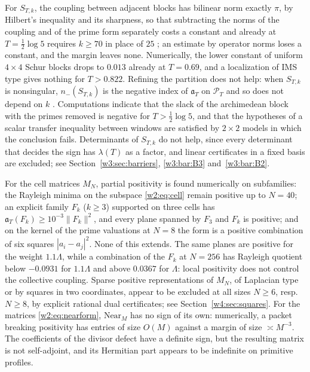 \documentclass[11pt]{amsart}
\theoremstyle{definition}
\theoremstyle{remark}
\numberwithin{equation}{section}
\newcommand{\PT}{\mathcal{P}_T}                        %
\newcommand{\aT}{\mathfrak{a}_T}                       %
\newcommand{\lam}{\lambda(T)}                          %
\begin{document}
For $S_{T,k}$, the coupling between adjacent blocks has bilinear norm exactly $\pi$, by Hilbert's inequality and its
sharpness, so that subtracting the norms of the coupling and of the prime form separately costs a constant and already
at $T=\frac12\log5$ requires $k\ge70$ in place of $25$ \cite[Remark~10.16]{P46}; an estimate by operator norms
loses a constant, and the margin leaves none. Numerically, the lower constant of uniform $4\times4$ Schur blocks drops to $0.013$ already at $T=0.69$,
and a localization of IMS type gives nothing for $T>0.822$. Refining the partition does not help: when $S_{T,k}$ is
nonsingular, $n_-(S_{T,k})$ is the negative index of $\aT$ on $\PT$ and so does not depend on $k$
\cite[Remark~10.15]{P46}. Computations indicate that the slack of the archimedean block with the primes removed is
negative for $T>\frac12\log5$, and that the hypotheses of a scalar transfer inequality between windows are satisfied by
$2\times2$ models in which the conclusion fails. Determinants of $S_{T,k}$ do not help, since every determinant that
decides the sign has $\lam$ as a factor, and linear certificates in a fixed basis are excluded; see
Section~\ref{w3:sec:barriers}, \ref{w3:bar:B3} and~\ref{w3:bar:B2}.

For the cell matrices $M_N$, partial positivity is found numerically on subfamilies: the Rayleigh minima on the
subspace \eqref{w2:eq:cell} remain positive up to $N=40$; an explicit family $F_k$ ($k\ge3$) supported on three cells
has $\aT(F_k)\ge10^{-3}\|F_k\|^2$, and every plane spanned by $F_3$ and $F_k$ is positive; and on the kernel of the
prime valuations at $N=8$ the form is a positive combination of six squares $|a_i-a_j|^2$. None of this extends. The
same planes are positive for the weight $1.1\Lambda$, while a combination of the $F_k$ at $N=256$ has Rayleigh quotient
below $-0.0931$ for $1.1\Lambda$ and above $0.0367$ for $\Lambda$: local positivity does not control the collective
coupling. Sparse positive representations of $M_N$, of Laplacian type or by squares in two coordinates, appear to be
excluded at all sizes $N\ge6$, resp.\ $N\ge8$, by explicit rational dual certificates; see
Section~\ref{w4:sec:squares}. For the matrices \eqref{w2:eq:nearform}, $\mathrm{Near}_M$ has no sign of its own:
numerically, a packet breaking positivity has entries of size $O(M)$ against a margin of size $\asymp M^{-3}$. The
coefficients of the divisor defect have a definite sign, but the resulting matrix is not self-adjoint, and its
Hermitian part appears to be indefinite on primitive profiles.
\end{document}
